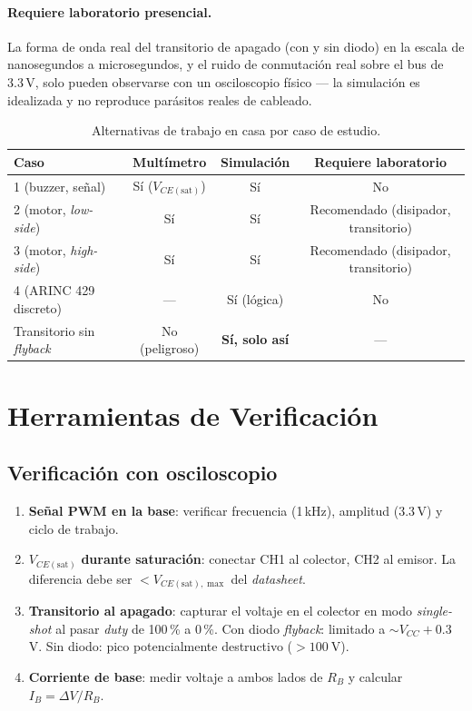 \documentclass[11pt]{article}
\begin{document}
\paragraph{Requiere laboratorio presencial.} La forma de onda real del transitorio de
apagado (con y sin diodo) en la escala de nanosegundos a microsegundos, y el ruido de
conmutación real sobre el bus de 3.3\,V, solo pueden observarse con un osciloscopio
físico — la simulación es idealizada y no reproduce parásitos reales de cableado.

\begin{table}[H]\centering
\caption{Alternativas de trabajo en casa por caso de estudio.}
\begin{tabular}{lccc}
\toprule
Caso & Multímetro & Simulación & Requiere laboratorio \\
\midrule
1 (buzzer, señal) & Sí ($V_{CE(\text{sat})}$) & Sí & No \\
2 (motor, \emph{low-side}) & Sí & Sí & Recomendado (disipador, transitorio) \\
3 (motor, \emph{high-side}) & Sí & Sí & Recomendado (disipador, transitorio) \\
4 (ARINC 429 discreto) & --- & Sí (lógica) & No \\
Transitorio sin \emph{flyback} & No (peligroso) & \textbf{Sí, solo así} & --- \\
\bottomrule
\end{tabular}
\end{table}

\section{Herramientas de Verificación}
\subsection{Verificación con osciloscopio}
\begin{enumerate}
  \item \textbf{Señal PWM en la base}: verificar frecuencia (1\,kHz), amplitud (3.3\,V)
        y ciclo de trabajo.
  \item $V_{CE(\text{sat})}$ \textbf{durante saturación}: conectar CH1 al colector, CH2 al
        emisor. La diferencia debe ser $< V_{CE(\text{sat}),\max}$ del \emph{datasheet}.
  \item \textbf{Transitorio al apagado}: capturar el voltaje en el colector en modo
        \emph{single-shot} al pasar \emph{duty} de 100\,\% a 0\,\%. Con diodo
        \emph{flyback}: limitado a $\sim V_{CC}+0.3$\,V. Sin diodo: pico potencialmente
        destructivo ($>\SI{100}{\volt}$).
  \item \textbf{Corriente de base}: medir voltaje a ambos lados de $R_B$ y calcular
        $I_B=\Delta V/R_B$.
\end{enumerate}
\end{document}
